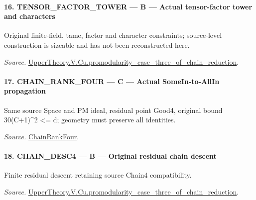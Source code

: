\documentclass[11pt,a4paper]{article}
\numberwithin{equation}{section}
\theoremstyle{remark}\newtheorem{remark}[theorem]{Remark}
\begin{document}
\paragraph{16. TENSOR\_\allowbreak FACTOR\_\allowbreak TOWER — B — Actual tensor-factor tower and characters}

Original finite-field, tame, factor and character constraints; source-level construction is sizeable and has not been reconstructed here.

\emph{Source.} \href{https://github.com/CocoSgt/riemann-hypothesis-lean/blob/7cbf7a0c32fca1badf05931879a37c3f8a2b03b4/src/Development/AutomorphicArithmetic/AutomorphicVarieties/ModularityArgument/ThresholdArguments/DenseThresholdCases/PromodularityCaseThreeOfLemmas.lean#L131-L153}{UpperTheory.V.Cu.promodularity\_\allowbreak case\_\allowbreak three\_\allowbreak of\_\allowbreak chain\_\allowbreak reduction}.



\paragraph{17. CHAIN\_\allowbreak RANK\_\allowbreak FOUR — C — Actual SomeIn-to-AllIn propagation}

Same source Space and PM ideal, residual point Good4, original bound 30(C+1)\textasciicircum{}2 <= d; geometry must preserve all identities.

\emph{Source.} \href{https://github.com/CocoSgt/riemann-hypothesis-lean/blob/7cbf7a0c32fca1badf05931879a37c3f8a2b03b4/src/Development/AutomorphicArithmetic/AutomorphicVarieties/ModularityArgument/ThresholdArguments/DenseThresholdCases/PromodularityCaseThree.lean#L26-L32}{ChainRankFour}.



\paragraph{18. CHAIN\_\allowbreak DESC4 — B — Original residual chain descent}

Finite residual descent retaining source Chain4 compatibility.

\emph{Source.} \href{https://github.com/CocoSgt/riemann-hypothesis-lean/blob/7cbf7a0c32fca1badf05931879a37c3f8a2b03b4/src/Development/AutomorphicArithmetic/AutomorphicVarieties/ModularityArgument/ThresholdArguments/DenseThresholdCases/PromodularityCaseThreeOfLemmas.lean#L131-L153}{UpperTheory.V.Cu.promodularity\_\allowbreak case\_\allowbreak three\_\allowbreak of\_\allowbreak chain\_\allowbreak reduction}.
\end{document}
